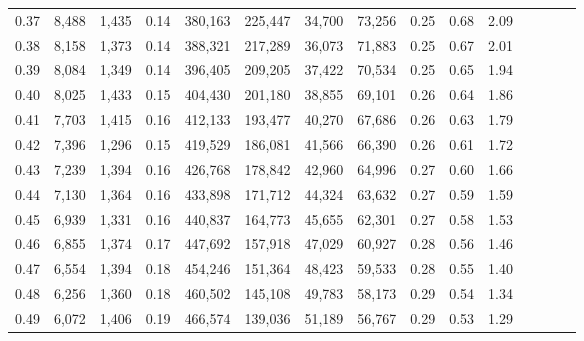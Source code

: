 \begin{tabular}{rrrcrrrrrrrrrrr}
0.37 &   8,488 &   1,435 &                                       0.14 &  380,163 &  225,447 &   34,700 &   73,256 &  0.25 &  0.68 &                         2.09 \\
0.38 &   8,158 &   1,373 &                                       0.14 &  388,321 &  217,289 &   36,073 &   71,883 &  0.25 &  0.67 &                         2.01 \\
0.39 &   8,084 &   1,349 &                                       0.14 &  396,405 &  209,205 &   37,422 &   70,534 &  0.25 &  0.65 &                         1.94 \\
0.40 &   8,025 &   1,433 &                                       0.15 &  404,430 &  201,180 &   38,855 &   69,101 &  0.26 &  0.64 &                         1.86 \\
0.41 &   7,703 &   1,415 &                                       0.16 &  412,133 &  193,477 &   40,270 &   67,686 &  0.26 &  0.63 &                         1.79 \\
0.42 &   7,396 &   1,296 &                                       0.15 &  419,529 &  186,081 &   41,566 &   66,390 &  0.26 &  0.61 &                         1.72 \\
0.43 &   7,239 &   1,394 &                                       0.16 &  426,768 &  178,842 &   42,960 &   64,996 &  0.27 &  0.60 &                         1.66 \\
0.44 &   7,130 &   1,364 &                                       0.16 &  433,898 &  171,712 &   44,324 &   63,632 &  0.27 &  0.59 &                         1.59 \\
0.45 &   6,939 &   1,331 &                                       0.16 &  440,837 &  164,773 &   45,655 &   62,301 &  0.27 &  0.58 &                         1.53 \\
0.46 &   6,855 &   1,374 &                                       0.17 &  447,692 &  157,918 &   47,029 &   60,927 &  0.28 &  0.56 &                         1.46 \\
0.47 &   6,554 &   1,394 &                                       0.18 &  454,246 &  151,364 &   48,423 &   59,533 &  0.28 &  0.55 &                         1.40 \\
0.48 &   6,256 &   1,360 &                                       0.18 &  460,502 &  145,108 &   49,783 &   58,173 &  0.29 &  0.54 &                         1.34 \\
0.49 &   6,072 &   1,406 &                                       0.19 &  466,574 &  139,036 &   51,189 &   56,767 &  0.29 &  0.53 &                         1.29 \\

\end{tabular}
